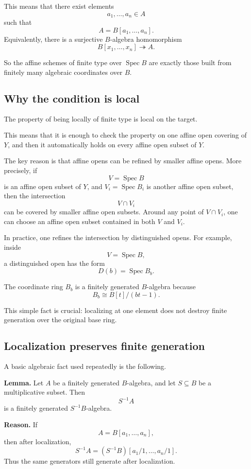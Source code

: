 \documentclass[12pt,a4paper]{article}
\DeclareMathOperator{\Spec}{Spec}
\providecommand{\Spec}{\operatorname{Spec}}
\theoremstyle{notespace}
\begin{document}
This means that there exist elements
\[
a_1,\dots,a_n\in A
\]
such that
\[
A=B[a_1,\dots,a_n].
\]
Equivalently, there is a surjective \(B\)-algebra homomorphism
\[
B[x_1,\dots,x_n]\twoheadrightarrow A.
\]

So the affine schemes of finite type over \(\Spec B\) are exactly those built from finitely many algebraic coordinates over \(B\).

\subsection{Why the condition is local}

The property of being locally of finite type is local on the target.

This means that it is enough to check the property on one affine open covering of \(Y\), and then it automatically holds on every affine open subset of \(Y\).

The key reason is that affine opens can be refined by smaller affine opens. More precisely, if
\[
V=\Spec B
\]
is an affine open subset of \(Y\), and \(V_i=\Spec B_i\) is another affine open subset, then the intersection
\[
V\cap V_i
\]
can be covered by smaller affine open subsets. Around any point of \(V\cap V_i\), one can choose an affine open subset contained in both \(V\) and \(V_i\).

In practice, one refines the intersection by distinguished opens. For example, inside
\[
V=\Spec B,
\]
a distinguished open has the form
\[
D(b)=\Spec B_b.
\]

The coordinate ring \(B_b\) is a finitely generated \(B\)-algebra because
\[
B_b\cong B[t]/(bt-1).
\]

This simple fact is crucial: localizing at one element does not destroy finite generation over the original base ring.

\subsection{Localization preserves finite generation}

A basic algebraic fact used repeatedly is the following.

\medskip

\textbf{Lemma.}
Let \(A\) be a finitely generated \(B\)-algebra, and let \(S\subseteq B\) be a multiplicative subset. Then
\[
S^{-1}A
\]
is a finitely generated \(S^{-1}B\)-algebra.

\medskip

\textbf{Reason.}
If
\[
A=B[a_1,\dots,a_n],
\]
then after localization,
\[
S^{-1}A=(S^{-1}B)[a_1/1,\dots,a_n/1].
\]
Thus the same generators still generate after localization.
\end{document}
